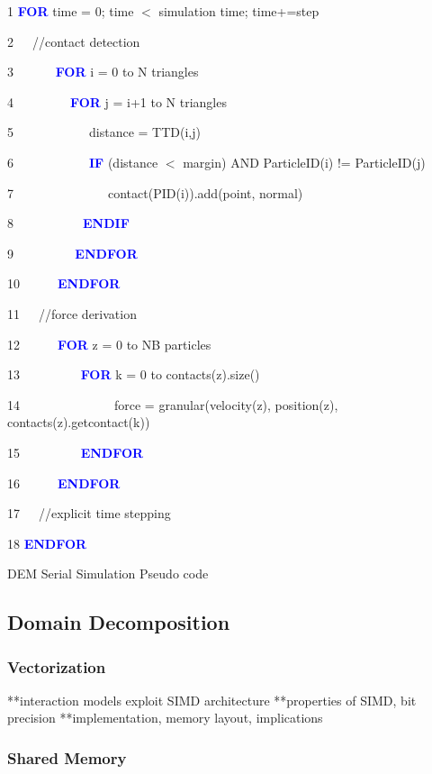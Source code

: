 \documentclass[times,12pt]{article}
\begin{document}
\begin{algorithm}	

1 \textbf{\textcolor{blue}{FOR}} time = 0; time $<$ simulation time; time+=step

2~~~//contact detection
		
3~~~~~~	\textbf{\textcolor{blue}{FOR}} i = 0 to N triangles

4~~~~~~~~~\textbf{\textcolor{blue}{FOR}} j = i+1 to N triangles
				
5~~~~~~~~~~~~distance = TTD(i,j)
				
6~~~~~~~~~~~~\textbf{\textcolor{blue}{IF}} (distance $<$ margin) AND ParticleID(i) != ParticleID(j)

7~~~~~~~~~~~~~~~contact(PID(i)).add(point, normal)

8~~~~~~~~~~~\textbf{\textcolor{blue}{ENDIF}}
			
9~~~~~~~~~\textbf{\textcolor{blue}{	ENDFOR}}
			
10~~~~~~\textbf{\textcolor{blue}{ENDFOR}}

11~~~//force derivation
		
12~~~~~~\textbf{\textcolor{blue}{FOR}} z = 0 to NB particles

13~~~~~~~~~	\textbf{\textcolor{blue}{FOR}} k = 0 to contacts(z).size()

14~~~~~~~~~~~~~~~force = granular(velocity(z), position(z), contacts(z).getcontact(k))

15~~~~~~~~~	\textbf{\textcolor{blue}{ENDFOR}}

16~~~~~~\textbf{\textcolor{blue}{ENDFOR}}
	
17~~~//explicit time stepping

18 \textbf{\textcolor{blue}{ENDFOR}}

\protect\caption{\label{alg1}DEM Serial Simulation Pseudo code}
\end{algorithm}


\subsection{Domain Decomposition}

\subsubsection{Vectorization}

**interaction models exploit SIMD architecture
**properties of SIMD, bit precision
**implementation, memory layout, implications

\subsubsection{Shared Memory}
\end{document}
